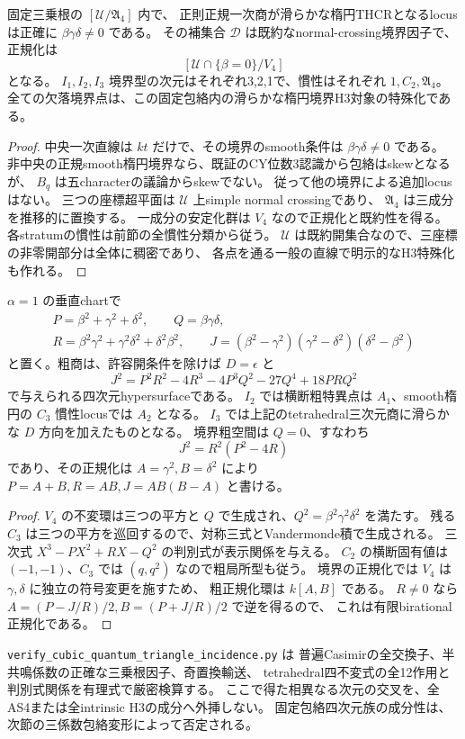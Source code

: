 \begin{proposition}[smooth楕円境界の欠落は固定包絡内で境界因子となる]
\label{prop:quantum-triangle-elliptic-closure}
固定三乗根の $[\mathcal U/\mathfrak A_4]$ 内で、
正則正規一次商が滑らかな楕円THCRとなるlocusは正確に $\beta\gamma\delta\ne0$ である。
その補集合 $\mathcal D$ は既約なnormal-crossing境界因子で、正規化は
\[
 [\mathcal U\cap\{\beta=0\}/V_4]
\]
となる。
$I_1,I_2,I_3$ 境界型の次元はそれぞれ3,2,1で、慣性はそれぞれ $1,C_2,\mathfrak A_4$。
全ての欠落境界点は、この固定包絡内の滑らかな楕円境界H3対象の特殊化である。
\end{proposition}
\begin{proof}
中央一次直線は $kt$ だけで、その境界のsmooth条件は $\beta\gamma\delta\ne0$ である。
非中央の正規smooth楕円境界なら、既証のCY位数3認識から包絡はskewとなるが、
$B_q$ は五characterの議論からskewでない。
従って他の境界による追加locusはない。
三つの座標超平面は $\mathcal U$ 上simple normal crossingであり、
$\mathfrak A_4$ は三成分を推移的に置換する。
一成分の安定化群は $V_4$ なので正規化と既約性を得る。
各stratumの慣性は前節の全慣性分類から従う。
$\mathcal U$ は既約開集合なので、三座標の非零開部分は全体に稠密であり、
各点を通る一般の直線で明示的なH3特殊化も作れる。
\end{proof}

\begin{proposition}
\label{prop:quantum-triangle-tetrahedral-coarse}
$\alpha=1$ の垂直chartで
\[
 \begin{gathered}
 P=\beta^2+\gamma^2+\delta^2,\qquad Q=\beta\gamma\delta,\\
 R=\beta^2\gamma^2+\gamma^2\delta^2+\delta^2\beta^2,\qquad
 J=(\beta^2-\gamma^2)(\gamma^2-\delta^2)(\delta^2-\beta^2)
 \end{gathered}
\]
と置く。粗商は、許容開条件を除けば $D=\epsilon$ と
\[
 J^2=P^2R^2-4R^3-4P^3Q^2-27Q^4+18PRQ^2
\]
で与えられる四次元hypersurfaceである。
$I_2$ では横断粗特異点は $A_1$、smooth楕円の $C_3$ 慣性locusでは $A_2$ となる。
$I_3$ では上記のtetrahedral三次元商に滑らかな $D$ 方向を加えたものとなる。
境界粗空間は $Q=0$、すなわち
\[
 J^2=R^2(P^2-4R)
\]
であり、その正規化は $A=\gamma^2,B=\delta^2$ により
$P=A+B,R=AB,J=AB(B-A)$ と書ける。
\end{proposition}
\begin{proof}
$V_4$ の不変環は三つの平方と $Q$ で生成され、$Q^2=\beta^2\gamma^2\delta^2$ を満たす。
残る $C_3$ は三つの平方を巡回するので、対称三式とVandermonde積で生成される。
三次式 $X^3-PX^2+RX-Q^2$ の判別式が表示関係を与える。
$C_2$ の横断固有値は $(-1,-1)$、$C_3$ では $(q,q^2)$ なので粗局所型も従う。
境界の正規化では $V_4$ は $\gamma,\delta$ に独立の符号変更を施すため、
粗正規化環は $k[A,B]$ である。
$R\ne0$ なら $A=(P-J/R)/2,B=(P+J/R)/2$ で逆を得るので、
これは有限birational正規化である。
\end{proof}

\texttt{verify\_cubic\_quantum\_triangle\_\allowbreak incidence.py} は
普遍Casimirの全交換子、半共鳴係数の正確な三乗根因子、奇置換輸送、
tetrahedral四不変式の全12作用と判別式関係を有理式で厳密検算する。
ここで得た相異なる次元の交叉を、全AS4または全intrinsic H3の成分へ外挿しない。
固定包絡四次元族の成分性は、次節の三係数包絡変形によって否定される。


